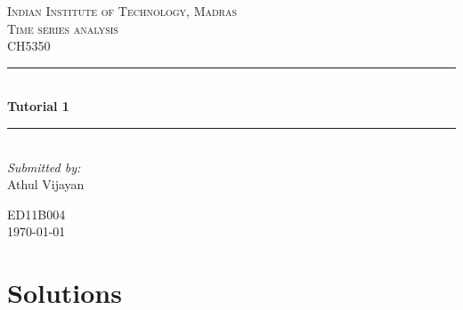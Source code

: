 \documentclass{article}
\newcommand{\HRule}{\rule{\linewidth}{0.2mm}} %
\begin{document}
\begin{titlepage}
    \center %
     

    \textsc{\LARGE Indian Institute of Technology, Madras}\\[1.5cm] %
    \textsc{\Large Time series analysis}\\[0.5cm] %
    \textsc{\large CH5350}\\[0.5cm] %


    \HRule \\[0.4cm]
    { \huge \bfseries Tutorial 1}\\[0.4cm] %
    \HRule \\[1.5cm]
     

    \Large \emph{Submitted by:}\\
    Athul Vijayan %

    ED11B004\\[8cm] %
    {\large \today}\\[6cm] %
    \vfill %
\end{titlepage}



\section{Solutions}
\end{document}
